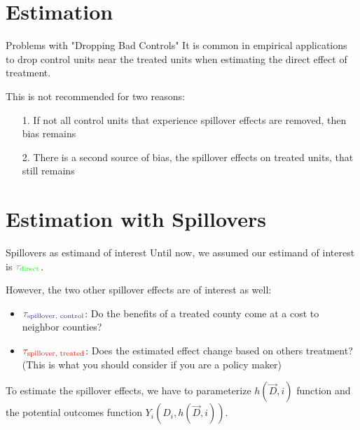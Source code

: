 \documentclass[aspectratio=169]{beamer}
\begin{document}
\section{Estimation}

\begin{frame}{Problems with "Dropping Bad Controls"}
    It is common in empirical applications to drop control units near the treated units when estimating the direct effect of treatment.

    This is not recommended for two reasons:

    \begin{itemize}
        \item[1.] If not all control units that experience spillover effects are removed, then bias remains
        
        \item[2.] There is a second source of bias, the spillover effects on treated units, that still remains
    \end{itemize}

    

\end{frame}


\section{Estimation with Spillovers}

\begin{frame}{Spillovers as estimand of interest}
    Until now, we assumed our estimand of interest is $\textcolor{green}{\tau_{\text{direct}}}$.
    
    However, the two other spillover effects are of interest as well:
    \begin{itemize}
        \item $\textcolor{purple}{\tau_{\text{spillover, control}}}$: Do the benefits of a treated county come at a cost to neighbor counties? 
        
        \item $\textcolor{red}{\tau_{\text{spillover, treated}}}$: Does the estimated effect change based on others treatment? (This is what you should consider if you are a policy maker)
    \end{itemize}
    
    To estimate the spillover effects, we have to parameterize $h(\vec{D}, i)$ function and the potential outcomes function $Y_i(D_i, h(\vec{D}, i))$.
\end{frame}
\end{document}
